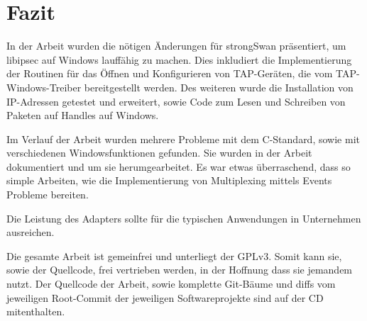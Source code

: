 



\section{Fazit}

In der Arbeit wurden die nötigen Änderungen für strongSwan präsentiert, um
libipsec auf Windows lauffähig zu machen. Dies inkludiert die Implementierung
der Routinen für das Öffnen und Konfigurieren von TAP-Geräten, die vom TAP-Windows-Treiber
bereitgestellt werden. Des weiteren wurde die Installation von IP-Adressen getestet
und erweitert, sowie Code zum Lesen und Schreiben von Paketen auf Handles auf Windows.

Im Verlauf der Arbeit wurden mehrere Probleme mit dem C-Standard, sowie mit
verschiedenen Windowsfunktionen gefunden. Sie wurden in der Arbeit dokumentiert
und um sie herumgearbeitet. Es war etwas überraschend, dass so simple Arbeiten,
wie die Implementierung von Multiplexing mittels Events Probleme bereiten.

Die Leistung des Adapters sollte für die typischen Anwendungen in Unternehmen ausreichen.


Die gesamte Arbeit ist gemeinfrei und unterliegt der GPLv3. Somit kann sie,
sowie der Quellcode, frei vertrieben werden, in der Hoffnung dass sie jemandem nutzt.
Der Quellcode der Arbeit, sowie komplette Git-Bäume und diffs vom jeweiligen Root-Commit
der jeweiligen Softwareprojekte sind auf der CD mitenthalten.
